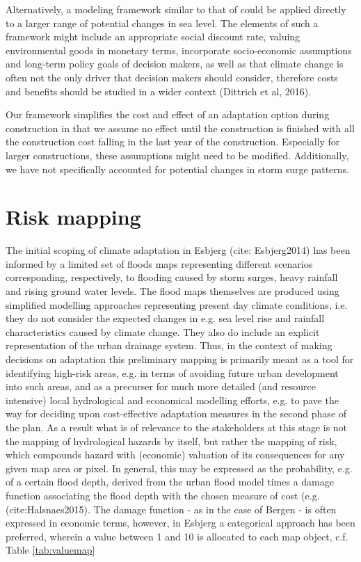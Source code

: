 \documentclass[draft,linenumbers]{agujournal}
\begin{document}
Alternatively, a modeling framework similar to that of \citet{Hallegatte&2013} could be applied directly to a larger range of potential changes in sea level. The elements of such a framework might include an appropriate social discount rate, valuing environmental goods in monetary terms, incorporate socio-economic assumptions and long-term policy goals of decision makers, as well as that climate change is often not the only driver that decision makers should consider, therefore costs and benefits should be studied in a wider context (Dittrich et al, 2016).

Our framework simplifies the cost and effect of an adaptation option during construction in that we assume no effect until the construction is finished with all the construction cost falling in the last year of the construction. Especially for larger constructions, these assumptions might need to be modified. Additionally, we have not specifically accounted for potential changes in storm surge patterns.


\section{Risk mapping}
\label{decision_tools_PartII}
The initial scoping of climate adaptation in Esbjerg {\color{blue}(cite: Esbjerg2014)} has been informed by a limited set of floods maps representing different scenarios corresponding, respectively, to flooding caused by storm surges, heavy rainfall and rising ground water levels. The flood maps themselves are produced using simplified modelling approaches representing present day climate conditions, i.e. they do not consider the expected changes in e.g. sea level rise and rainfall characteristics caused by climate change. They also do include an explicit representation of the urban drainage system. Thus, in the context of making decisions on adaptation this preliminary mapping is primarily meant as a tool for identifying high-risk areas, e.g. in terms of avoiding future urban development into such areas, and as a precurser for much more detailed (and resource intensive) local hydrological and economical modelling efforts, e.g. to pave the way for deciding upon cost-effective adaptation measures in the second phase of the plan. As a result what is of relevance to the stakeholders at this stage is not the mapping of hydrological hazards by itself, but rather the mapping of risk, which compounds hazard with (economic) valuation of its consequences for any given map area or pixel. In general, this may be expressed as the probability, e.g. of a certain flood depth, derived from the urban flood model times a damage function associating the flood depth with the chosen measure of cost (e.g. {\color{blue}(cite:Halsnaes2015)}. The damage function - as in the case of Bergen - is often expressed in economic terms, however, in Esbjerg a categorical approach has been preferred, wherein a value between 1 and 10 is allocated to each map object, c.f. Table \ref{tab:valuemap}
\end{document}

